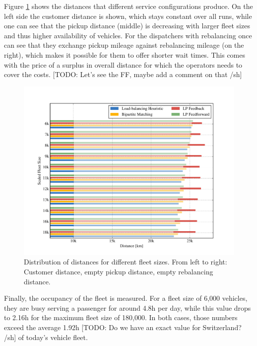 
Figure \ref{fig:distances} shows the distances that different service configurations
produce. On the left side the customer distance is shown, which stays constant
over all runs, while one can see that the pickup distance (middle) is decreasing
with larger fleet sizes and thus higher availability of vehicles. For the dispatchers
with rebalancing once can see that they exchange pickup mileage against rebalancing
mileage (on the right), which makes it possible for them to offer shorter wait
times. This comes with the price of a surplus in overall distance for which the
operators needs to cover the costs. [TODO: Let's see the FF, maybe add a comment
on that /sh]

\begin{figure}
\includegraphics[width=1.0\textwidth]{figures/distances.pdf}
\caption{Distribution of distances for different fleet sizes. From left to right:
Customer distance, empty pickup distance, empty rebalancing distance.}
\label{fig:distances}
\end{figure}

Finally, the occupancy of the fleet is measured. For a fleet size of 6,000
vehicles, they are busy serving a passenger for around 4.8h per day, while
this value drops to 2.16h for the maximum fleet size of 180,000. In both cases,
those numbers exceed the average 1.92h [TODO: Do we have an exact value for Switzerland? /sh] of today's vehicle fleet.

